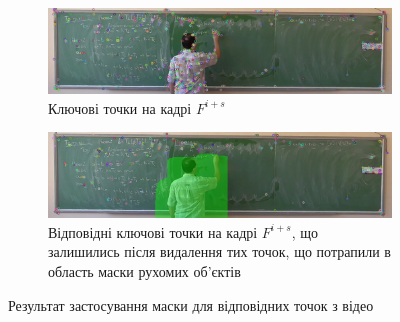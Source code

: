 \begin{figure}[H]
    \centering
    \begin{subfigure}[b]{0.55\textwidth}
        \centering
        \includegraphics[width=\textwidth]{images/next_frame_kp}
        \caption{Ключові точки на кадрі $F^{i+s}$
            \label{fig:yakovlev:keypoints:a}
        }
    \end{subfigure}
    \begin{subfigure}[b]{0.55\textwidth}
        \centering
        \includegraphics[width=\textwidth]{images/next_frame_matches_mask}
        \caption{Відповідні ключові точки на кадрі $F^{i+s}$, що залишились після
            видалення тих точок, що потрапили в область маски рухомих
            об'єктів
            \label{fig:yakovlev:keypoints:b}
        }
    \end{subfigure}
    \caption{Результат застосування маски для відповідних точок з відео \cite{yakovlev_discrete_math_video}
        \label{fig:yakovlev:keypoints}
    }
\end{figure}
